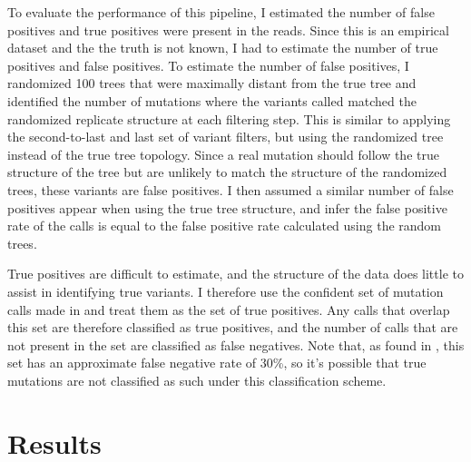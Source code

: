 To evaluate the performance of this pipeline, I estimated the number of false positives and true positives were present in the reads. Since this is an empirical dataset and the the truth is not known, I had to estimate the number of true positives and false positives. To estimate the number of false positives, I randomized 100 trees that were maximally distant from the true tree and identified the number of mutations where the variants called matched the randomized replicate structure at each filtering step. This is similar to applying the second-to-last and last set of variant filters, but using the randomized tree instead of the true tree topology. Since a real mutation should follow the true structure of the tree but are unlikely to match the structure of the randomized trees, these variants are false positives. I then assumed a similar number of false positives appear when using the true tree structure, and infer the false positive rate of the calls is equal to the false positive rate calculated using the random trees.  %

True positives are difficult to estimate, and the structure of the data does little to assist in identifying true variants. I therefore use the confident set of mutation calls made in \cite{orr_phylogenomic_2020} and treat them as the set of true positives. Any calls that overlap this set are therefore classified as true positives, and the number of calls that are not present in the set are classified as false negatives. Note that, as found in \cite{orr_phylogenomic_2020}, this set has an approximate false negative rate of 30\%, so it's possible that true mutations are not classified as such under this classification scheme. %


\section{Results}

